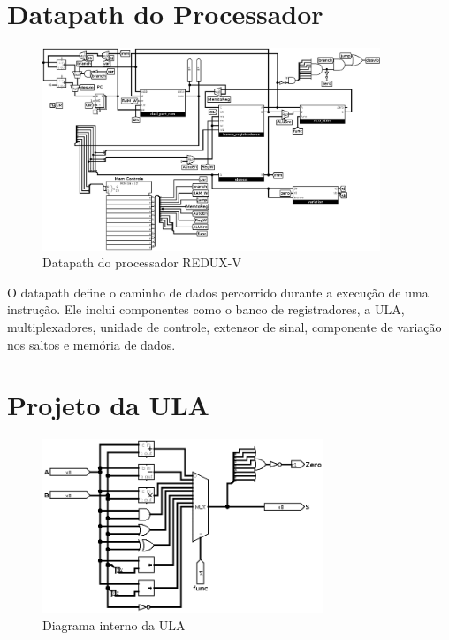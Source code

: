 \documentclass[12pt]{article}
\begin{document}
\section{Datapath do Processador}

\begin{figure}[H]
\centering
\includegraphics[width=0.9\textwidth]{images/Redux-V_datapath_2.png}
\caption{Datapath do processador REDUX-V}
\label{fig:datapath}
\end{figure}

O datapath define o caminho de dados percorrido durante a execução de uma instrução. Ele inclui componentes como o banco de registradores, a ULA, multiplexadores, unidade de controle, extensor de sinal, componente de variação nos saltos e memória de dados.

\section{Projeto da ULA}

\begin{figure}[H]
\centering
\includegraphics[width=0.75\textwidth]{images/ALU.png}
\caption{Diagrama interno da ULA}
\label{fig:ula}
\end{figure}
\end{document}
